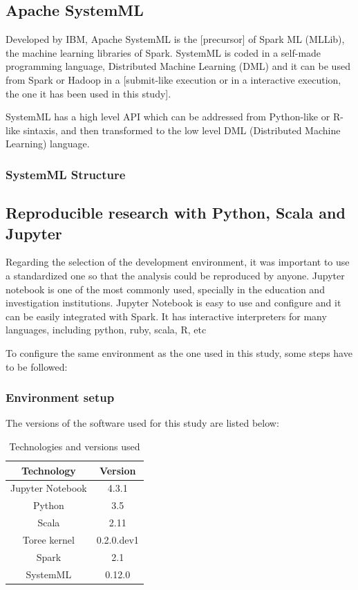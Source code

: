 \documentclass[11pt]{article} %
\begin{document}
  \subsection{Apache SystemML}

    Developed by IBM, Apache SystemML is the [precursor] of Spark ML (MLLib), the machine learning libraries of Spark.
    SystemML is coded in a self-made programming language, Distributed Machine Learning (DML) and it can be used from Spark or Hadoop in a [submit-like execution or in a interactive execution, the one it has been used in this study].

    SystemML has a high level API which can be addressed from Python-like or R-like sintaxis, and then transformed to the low level DML (Distributed Machine Learning) language.

    \subsubsection{SystemML Structure}



  \subsection{Reproducible research with Python, Scala and Jupyter}

    Regarding the selection of the development environment, it was important to use a standardized one so that the analysis could be reproduced by anyone. Jupyter notebook is one of the most commonly used, specially in the education and investigation institutions. Jupyter Notebook is easy to use and configure and it can be easily integrated with Spark. It has interactive interpreters for many languages, including python, ruby, scala, R, etc

    To configure the same environment as the one used in this study, some steps have to be followed:

    \subsubsection{Environment setup}

      The versions of the software used for this study are listed below:

    \begin{table}[!h]
      \centering
      \begin{tabular}{| c | c |}
        \hline

        Technology & Version \\ \hline
        Jupyter Notebook & 4.3.1 \\ \hline
        Python & 3.5 \\ \hline
        Scala & 2.11 \\ \hline
        Toree kernel & 0.2.0.dev1 \\ \hline
        Spark & 2.1 \\ \hline
        SystemML & 0.12.0 \\

        \hline
      \end{tabular}
      \caption{Technologies and versions used}
    \end{table}
\end{document}
